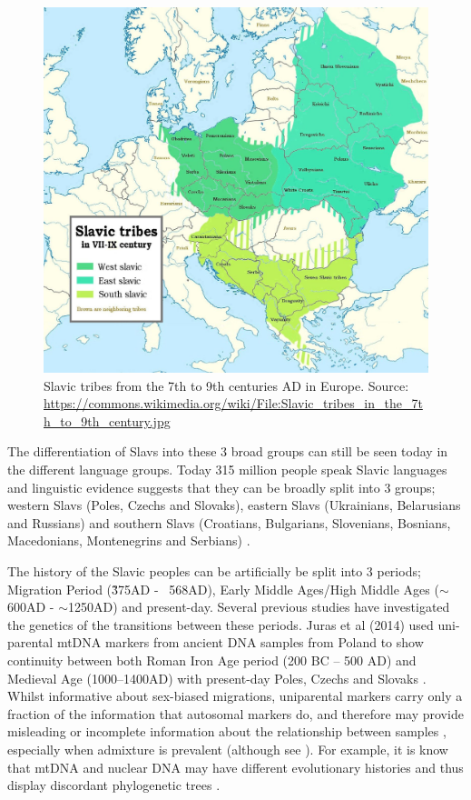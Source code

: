 \begin{figure}[htp]
    \centering
    \includegraphics[width=1.0\textwidth]{../images/chapter5/Slavic_tribes_in_the_7th_to_9th_century.jpg}
    \caption{Slavic tribes from the 7th to 9th centuries AD in Europe. Source: \url{https://commons.wikimedia.org/wiki/File:Slavic_tribes_in_the_7th_to_9th_century.jpg}}
    \label{fig:Slavic_tribes}
\end{figure}

The differentiation of Slavs into these 3 broad groups can still be seen today in the different language groups. Today 315 million people speak Slavic languages and linguistic evidence suggests that they can be broadly split into 3 groups; western Slavs (Poles, Czechs and Slovaks), eastern Slavs (Ukrainians, Belarusians and Russians) and southern Slavs (Croatians, Bulgarians, Slovenians, Bosnians, Macedonians, Montenegrins and Serbians) \cite{sussex2006slavic}. 

The history of the Slavic peoples can be artificially be split into 3 periods; Migration Period (\~375AD - ~568AD), Early Middle Ages/High Middle Ages ($\sim$\texttildelow 600AD - $\sim$\texttildelow 1250AD) and present-day. Several previous studies have investigated the genetics of the transitions between these periods. Juras et al (2014) used uni-parental mtDNA markers from ancient DNA samples from Poland to show continuity between both Roman Iron Age period (200 BC – 500 AD) and Medieval Age (1000–1400AD) with present-day Poles, Czechs and Slovaks \cite{Juras2014}. Whilst informative about sex-biased migrations, uniparental markers carry only a fraction of the information that autosomal markers do, and therefore may provide misleading or incomplete information about the relationship between  samples \cite{Shaw16122, malinsky2018whole}, especially when admixture is prevalent (although see \cite{10.1080/10635150500234674}). For example, it is know that mtDNA and nuclear DNA may have different evolutionary histories and thus display discordant phylogenetic trees \cite{posth2017deeply}. 

